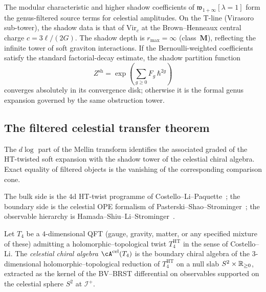 \begin{remark}
\label{rem:ch-core-w-shadow}
The modular characteristic and higher shadow coefficients of
$\mathfrak{w}_{1+\infty}[\lambda = 1]$ form the genus-filtered
source terms for celestial amplitudes. On the T-line (Virasoro
sub-tower), the shadow data is that of $\mathrm{Vir}_c$ at the
Brown--Henneaux central charge $c = 3\ell/(2G)$. The shadow
depth is $r_{\max} = \infty$ (class~$\mathbf{M}$),
reflecting the infinite tower of soft graviton interactions.
If the Bernoulli-weighted coefficients satisfy the standard
factorial-decay estimate, the shadow partition function
\[
Z^{\mathrm{sh}}=\exp\!\left(\sum_{g\geq0}F_g\,\hbar^{2g}\right)
\]
converges absolutely in its convergence disk; otherwise it is the
formal genus expansion governed by the same obstruction tower.
\end{remark}


\subsection{The filtered celestial transfer theorem}
\label{subsec:filtered-celestial-transfer}

The $d\log$ part of the Mellin transform identifies the associated graded of the HT-twisted soft expansion with the shadow tower of the celestial chiral algebra. Exact equality of filtered objects is the vanishing of the corresponding comparison cone.

The bulk side is the $4$d HT-twist programme of Costello--Li--Paquette~\cite{CostelloLiSugraTwist, CostelloPaquetteTwistedSugraStates}; the boundary side is the celestial OPE formalism of Pasterski--Shao--Strominger~\cite{PasterskiShaoStromingerFlatSpaceHolog, StromingerLectures2018}; the observable hierarchy is Hamada--Shiu--Li--Strominger~\cite{HamadaShiuSubsubSoft,LiStromingerHigherSoft}.

\begin{definition}
\label{def:celestial-chiral-algebra-ht-twist}
Let $T_4$ be a $4$-dimensional QFT (gauge, gravity, matter, or any
specified mixture of these) admitting a holomorphic--topological twist $T_4^{\mathrm{HT}}$
in the sense of Costello--Li. The \emph{celestial chiral algebra}
$\cA^{\mathrm{cel}}(T_4)$ is the boundary chiral algebra of the
$3$-dimensional holomorphic--topological reduction of $T_4^{\mathrm{HT}}$
on a null slab $S^2 \times \mathbb R_{\geq 0}$, extracted as the kernel of the
BV--BRST differential on observables supported on the celestial
sphere $S^2$ at $\mathscr{I}^+$.
\end{definition}

